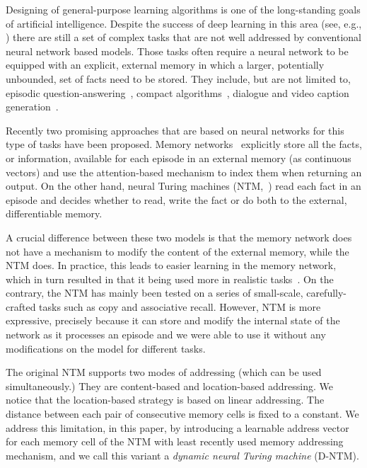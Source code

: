 \documentclass[12pt]{article}
\begin{document}
Designing of general-purpose learning algorithms is one of the long-standing goals
of artificial intelligence. Despite the success of deep learning in this area
(see, e.g., \citep{Goodfellow-et-al-2016-Book}) there are still a set of complex tasks
that are not well addressed by conventional neural network based models. Those tasks often
require a neural network to be equipped with an explicit, external memory in
which a larger, potentially unbounded, set of facts need to be stored. They
include, but are not limited to, episodic question-answering~\citep{weston2014memory,hermann2015teaching,hill2015goldilocks}, compact algorithms~\citep{zaremba2015learning}, dialogue \citep{serban2016building,vinyals2015neural} and video caption generation~\citep{yao2015capgenvid}.

Recently two promising approaches that are based on neural networks for this type of tasks
have been proposed. Memory networks~\citep{weston2014memory} explicitly store all
the facts, or information, available for each episode in an external memory (as
continuous vectors) and use the attention-based mechanism to index them when
returning an output. On the other hand, neural Turing
machines (NTM,~\citep{graves2014neural}) read each fact in an episode and decides
whether to read, write the fact or do both to the external, differentiable memory.

A crucial difference between these two models is that the memory network does
not have a mechanism to modify the content of the external memory, while the NTM
does. In practice, this leads to easier learning in the memory network, which in
turn resulted in that it being used more in realistic tasks~\citep{bordes2015large,dodge2015}.
On the contrary, the NTM has mainly been tested on a series of small-scale,
carefully-crafted tasks such as copy and associative recall. However, NTM is more expressive, precisely 
because it can store and modify the internal state of the network as 
it processes an episode and we were able to use it without any modifications on the model 
for different tasks.


The original NTM supports two modes of addressing (which can be used
simultaneously.) They are content-based and location-based addressing. We notice
that the location-based strategy is based on linear addressing. The distance
between each pair of consecutive memory cells is fixed to a constant. We address
this limitation, in this paper, by introducing a learnable address vector for
each memory cell of the NTM with least recently used memory addressing mechanism, 
and we call this variant a {\it dynamic neural Turing machine} (D-NTM).
\end{document}
